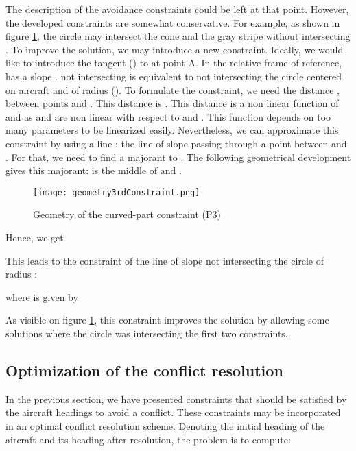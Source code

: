 \documentclass[a4paper, 10pt]{IEEEtran}
\begin{document}
The description of the avoidance constraints could be left at that point. However, the developed constraints are somewhat conservative. For example, as shown in figure \ref{fig:3rdConstraint}, the circle  may intersect the cone and the gray stripe without intersecting . To improve the solution, we may introduce a new constraint. Ideally, we would like to introduce the tangent () to  at point A. In the relative frame of reference,  has a slope  .    not intersecting  is equivalent to  not intersecting the circle centered on aircraft  and of radius (). To formulate the constraint, we need the distance , between points  and . This distance is . This distance is a non linear function of  and  as  and  are non linear with respect to   and . This function depends on too many parameters to be linearized easily. Nevertheless, we can approximate this constraint by using a line : the line of slope  passing through a point between  and . For that, we need to find a majorant to .  The following geometrical development gives this majorant:  is the middle of  and .  
\begin{figure}[ht]
\centering
    \texttt{[image: geometry3rdConstraint.png]}
    \caption{Geometry of the curved-part constraint (P3)}
\label{fig:3rdConstraint}
\end{figure}

Hence, we get


This leads to the constraint of the line of slope  not intersecting the circle of radius  : 



where  is given by

 
As visible on figure \ref{fig:3rdConstraint}, this constraint improves the solution by allowing some solutions where the circle  was intersecting the first two constraints. 









\subsection{Optimization of the conflict resolution}
In the previous section, we have presented constraints that should be satisfied by the aircraft headings to avoid a conflict. These constraints may be incorporated in an optimal conflict resolution scheme. Denoting the initial heading  of the aircraft  and  its heading after resolution, the problem is to compute:
\end{document}
